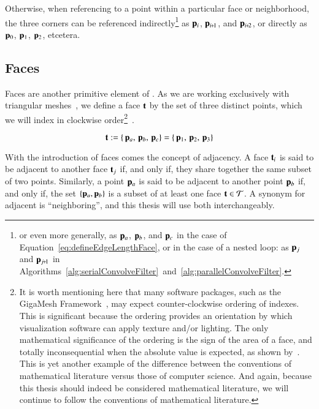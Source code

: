 Otherwise, when referencing to a point within a particular face or neighborhood, the three corners can be referenced indirectly\footnote{or even more generally, as $\mathbf{p}_a$, $\mathbf{p}_b$, and $\mathbf{p}_c$ in the case of Equation~\ref{eq:defineEdgeLengthFace}, or in the case of a nested loop: as $\mathbf{p}_j$ and $\bp_{\sjpo}$ in Algorithms~\ref{alg:serialConvolveFilter}~and~\ref{alg:parallelConvolveFilter}.} as $\mathbf{p}_i$, $\bp_{\sipo}$, and $\bp_{\sipt}$, or directly as $\mathbf{p}_0$, $\mathbf{p}_1$, $\mathbf{p}_2$, etcetera.~\cite[p.~25]{Mara12}%
%

%
%
%
%
\subsection{Faces}
\label{ch2sTDDssF}
Faces are another primitive element of \tdd{}. As we are working exclusively with triangular meshes~\cite[p.~26]{Mara12}, we define a face $\mathbf{t}$ by the set of three distinct points, which we will index in clockwise order\footnote{It is worth mentioning here that many software packages, such as the GigaMesh Framework~\cite[p.~89]{Mara12}, may expect counter-clockwise ordering of indexes. This is significant because the ordering provides an orientation by which visualization software can apply texture and/or lighting. The only mathematical significance of the ordering is the sign of the area of a face, and totally inconsequential when the absolute value is expected, as shown by~\cite[p.~2]{Braden86}. This is yet another example of the difference between the conventions of mathematical literature versus those of computer science. And again, because this thesis should indeed be considered mathematical literature, we will continue to follow the conventions of mathematical literature.}~\cite[p.~4]{Mara17}.

\begin{equation}
	\mathbf{t} := \left \{\,\mathbf{p}_a,\,\mathbf{p}_b,\,\mathbf{p}_c\right \} = \left \{\,\mathbf{p}_1,\,\mathbf{p}_2,\,\mathbf{p}_3\right \}
	\label{eq:defineFaces}
\end{equation}

With the introduction of faces comes the concept of adjacency. A face $\mathbf{t}_i$ is said to be \gls{adjacent} to another face $\mathbf{t}_j$ if, and only if, they share together the same subset of two points. Similarly, a point $\mathbf{p}_a$ is said to be adjacent to another point $\mathbf{p}_b$ if, and only if, the set $\{\mathbf{p}_a, \mathbf{p}_b\}$ is a subset of at least one face $\mathbf{t} \in \mathcal{T}$. A synonym for adjacent is ``\gls{neighboring}'', and this thesis will use both interchangeably.

